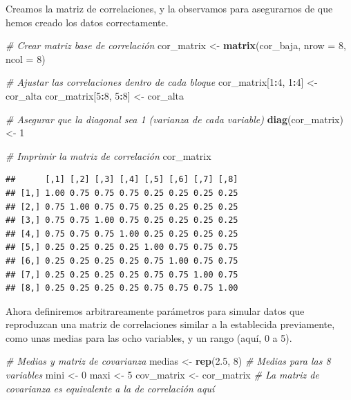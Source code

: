 \documentclass[
]{book}
\newenvironment{Shaded}{\begin{snugshade}}{\end{snugshade}}
\newcommand{\AttributeTok}[1]{\textcolor[rgb]{0.13,0.29,0.53}{#1}}
\newcommand{\CommentTok}[1]{\textcolor[rgb]{0.56,0.35,0.01}{\textit{#1}}}
\newcommand{\DecValTok}[1]{\textcolor[rgb]{0.00,0.00,0.81}{#1}}
\newcommand{\FloatTok}[1]{\textcolor[rgb]{0.00,0.00,0.81}{#1}}
\newcommand{\FunctionTok}[1]{\textcolor[rgb]{0.13,0.29,0.53}{\textbf{#1}}}
\newcommand{\NormalTok}[1]{#1}
\newcommand{\OtherTok}[1]{\textcolor[rgb]{0.56,0.35,0.01}{#1}}
\newcommand{\SpecialCharTok}[1]{\textcolor[rgb]{0.81,0.36,0.00}{\textbf{#1}}}
\begin{document}
Creamos la matriz de correlaciones, y la observamos para asegurarnos de que hemos creado los datos correctamente.

\begin{Shaded}
\begin{Highlighting}[]
\CommentTok{\# Crear matriz base de correlación}
\NormalTok{cor\_matrix }\OtherTok{\textless{}{-}} \FunctionTok{matrix}\NormalTok{(cor\_baja, }\AttributeTok{nrow =} \DecValTok{8}\NormalTok{, }\AttributeTok{ncol =} \DecValTok{8}\NormalTok{)}

\CommentTok{\# Ajustar las correlaciones dentro de cada bloque}
\NormalTok{cor\_matrix[}\DecValTok{1}\SpecialCharTok{:}\DecValTok{4}\NormalTok{, }\DecValTok{1}\SpecialCharTok{:}\DecValTok{4}\NormalTok{] }\OtherTok{\textless{}{-}}\NormalTok{ cor\_alta}
\NormalTok{cor\_matrix[}\DecValTok{5}\SpecialCharTok{:}\DecValTok{8}\NormalTok{, }\DecValTok{5}\SpecialCharTok{:}\DecValTok{8}\NormalTok{] }\OtherTok{\textless{}{-}}\NormalTok{ cor\_alta}

\CommentTok{\# Asegurar que la diagonal sea 1 (varianza de cada variable)}
\FunctionTok{diag}\NormalTok{(cor\_matrix) }\OtherTok{\textless{}{-}} \DecValTok{1}

\CommentTok{\# Imprimir la matriz de correlación}
\NormalTok{cor\_matrix}
\end{Highlighting}
\end{Shaded}

\begin{verbatim}
##      [,1] [,2] [,3] [,4] [,5] [,6] [,7] [,8]
## [1,] 1.00 0.75 0.75 0.75 0.25 0.25 0.25 0.25
## [2,] 0.75 1.00 0.75 0.75 0.25 0.25 0.25 0.25
## [3,] 0.75 0.75 1.00 0.75 0.25 0.25 0.25 0.25
## [4,] 0.75 0.75 0.75 1.00 0.25 0.25 0.25 0.25
## [5,] 0.25 0.25 0.25 0.25 1.00 0.75 0.75 0.75
## [6,] 0.25 0.25 0.25 0.25 0.75 1.00 0.75 0.75
## [7,] 0.25 0.25 0.25 0.25 0.75 0.75 1.00 0.75
## [8,] 0.25 0.25 0.25 0.25 0.75 0.75 0.75 1.00
\end{verbatim}

Ahora definiremos arbitrareamente parámetros para simular datos que reproduzcan una matriz de correlaciones similar a la establecida previamente, como unas medias para las ocho variables, y un rango (aquí, 0 a 5).

\begin{Shaded}
\begin{Highlighting}[]
\CommentTok{\# Medias y matriz de covarianza}
\NormalTok{medias }\OtherTok{\textless{}{-}} \FunctionTok{rep}\NormalTok{(}\FloatTok{2.5}\NormalTok{, }\DecValTok{8}\NormalTok{)  }\CommentTok{\# Medias para las 8 variables}
\NormalTok{mini }\OtherTok{\textless{}{-}} \DecValTok{0}
\NormalTok{maxi }\OtherTok{\textless{}{-}} \DecValTok{5}
\NormalTok{cov\_matrix }\OtherTok{\textless{}{-}}\NormalTok{ cor\_matrix  }\CommentTok{\# La matriz de covarianza es equivalente a la de correlación aquí}
\end{Highlighting}
\end{Shaded}
\end{document}
